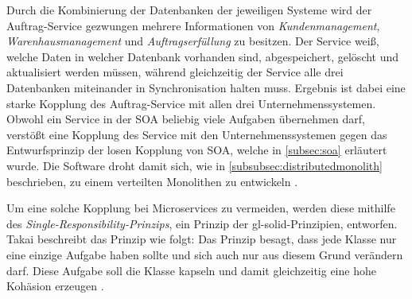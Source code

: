     Durch die Kombinierung der Datenbanken der jeweiligen Systeme wird der Auftrag-Service gezwungen mehrere Informationen von \emph{Kundenmanagement}, \emph{Warenhausmanagement} und \emph{Auftragserfüllung} zu besitzen. Der Service weiß, welche Daten in welcher Datenbank vorhanden sind, abgespeichert, gelöscht und aktualisiert werden müssen, während gleichzeitig der Service alle drei Datenbanken miteinander in Synchronisation halten muss. Ergebnis ist dabei eine starke Kopplung des Auftrag-Service mit allen drei Unternehmenssystemen. Obwohl ein Service in der SOA beliebig viele Aufgaben übernehmen darf, verstößt eine Kopplung des Service mit den Unternehmenssystemen gegen das Entwurfsprinzip der losen Kopplung von SOA, welche in \autoref{subsec:soa} erläutert wurde. Die Software droht damit sich, wie in \autoref{subsubsec:distributedmonolith} beschrieben, zu einem verteilten Monolithen zu entwickeln \parencites[S. 20]{takai2017architektur}{richards2016msavssoa}.
    
    Um eine solche Kopplung bei Microservices zu vermeiden, werden diese mithilfe des \emph{Single-Responsibility-Prinzips}, ein Prinzip der \gls{gl-solid}-Prinzipien, entworfen. Takai beschreibt das Prinzip wie folgt: \glqq Das Prinzip besagt, dass jede Klasse nur eine einzige Aufgabe haben sollte und sich auch nur aus diesem Grund verändern darf. Diese Aufgabe soll die Klasse kapseln und damit gleichzeitig eine hohe Kohäsion erzeugen\grqq{} \parencite[S. 18]{takai2017architektur}.
    \clearpage
    
